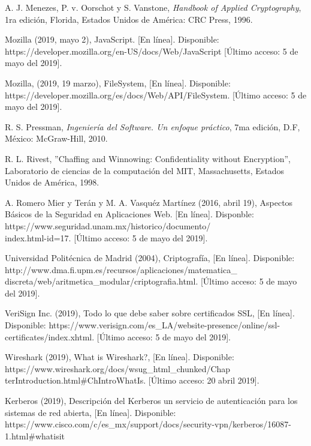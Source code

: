 \documentclass[12pt, a4paper, titlepage]{report}
\begin{document}
\begin{thebibliography}{20}
        A. J. Menezes, P. v. Oorschot y S. Vanstone, \textit{Handbook of Applied Cryptography}, 1ra edición, Florida, Estados Unidos de América: CRC Press, 1996.
		
		Mozilla (2019, mayo 2), JavaScript. [En línea]. Disponible:
		https://developer.mozilla.org/en-US/docs/Web/JavaScript [Último acceso: 5 de mayo del 2019].
		
        Mozilla, (2019, 19 marzo), FileSystem, [En línea]. Disponible: https://developer.mozilla.org/es/docs/Web/API/FileSystem. [Último acceso: 5 de mayo del 2019].
		
		R. S. Pressman, \textit{Ingeniería del Software. Un enfoque práctico}, 7ma edición, D.F, México: McGraw-Hill, 2010.
		
		R. L. Rivest, ''Chaffing and Winnowing: Confidentiality without Encryption'', Laboratorio de ciencias de la computación del MIT, Massachusetts, Estados Unidos de América, 1998.
		
		A. Romero Mier y Terán y M. A. Vasquéz Martínez (2016, abril 19), Aspectos Básicos de la Seguridad en Aplicaciones Web. [En línea]. Disponble: https://www.seguridad.unam.mx/historico/documento/\\index.html-id=17. [Último acceso: 5 de mayo del 2019].
        
	    Universidad Politécnica de Madrid (2004), Criptografía, [En línea]. Disponible: http://www.dma.fi.upm.es/recursos/aplicaciones/matematica\_ discreta/web/aritmetica\_modular/criptografia.html. [Último acceso: 5 de mayo del 2019].
	    
        VeriSign Inc. (2019), Todo lo que debe saber sobre certificados SSL, [En línea]. Disponible: https://www.verisign.com/es\_LA/website-presence/online/ssl-certificates/index.xhtml. [Último acceso: 5 de mayo del 2019].
        
        Wireshark (2019), What is Wireshark?, [En línea]. Disponible: https://www.wireshark.org/docs/wsug\_html\_chunked/Chap\\terIntroduction.html\#ChIntroWhatIs. [Último acceso: 20 abril 2019].
        
        Kerberos (2019), Descripción del Kerberos un servicio de autenticación para los sistemas de red abierta, [En línea]. Disponible: https://www.cisco.com/c/es\_mx/support/docs/security-vpn/kerberos/16087-1.html\#whatisit
        

\end{thebibliography}
\end{document}
